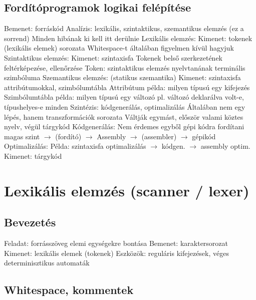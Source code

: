 \documentclass[12pt,a4paper]{article}
\begin{document}
\pagebreak

\subsection{Fordítóprogramok logikai felépítése}

\begin{outline}
	\1 Bemenet: forráskód
	\1 Analízis: lexikális, szintaktikus, szemantikus elemzés (ez a sorrend)
		\2 Minden hibának ki kell itt derülnie
		\2 Lexikális elemzés:
			\3 Kimenet: tokenek (lexikális elemek) sorozata
			\3 Whitespace-t általában figyelmen kívül hagyjuk
		\2 Szintaktikus elemzés:
			\3 Kimenet: szintaxisfa
			\3 Tokenek belső szerkezetének feltérképezése, ellenőrzése
			\3 Token: szintaktikus elemzés nyelvtanának terminális szimbóluma
		\2 Szemantikus elemzés: (statikus szemantika)
			\3 Kimenet: szintaxisfa attribútumokkal, szimbólumtábla
				\4 Attribútum példa: milyen típusú egy kifejezés
				\4 Szimbólumtábla példa: milyen típusú egy változó
			\3 pl. változó deklarálva volt-e, típushelyes-e minden
	\1 Szintézis: kódgenerálás, optimalizálás
		\2 Általában nem egy lépés, hanem transzformációk sorozata
		\2 Váltják egymást, először valami köztes nyelv, végül tárgykód
		\2 Kódgenerálás:
			\3 Nem érdemes egyből gépi kódra fordítani
			\3 magas szint $\to$ (fordító) $\to$ Assembly $\to$ (assembler) $\to$ gépikód
		\2 Optimalizálás:
			\3 Példa: szintaxisfa optimalizálás $\to$ kódgen. $\to$ assembly optim.
	\1 Kimenet: tárgykód
\end{outline}

\pagebreak

\section{Lexikális elemzés (scanner / lexer)}

\subsection{Bevezetés}

\begin{outline}
	\1 Feladat: forrásszöveg elemi egységekre bontása
	\1 Bemenet: karaktersorozat
	\1 Kimenet: lexikális elemek (tokenek)
	\1 Eszközök: reguláris kifejezések, véges determinisztikus automaták
\end{outline}

\subsection{Whitespace, kommentek}
\end{document}
